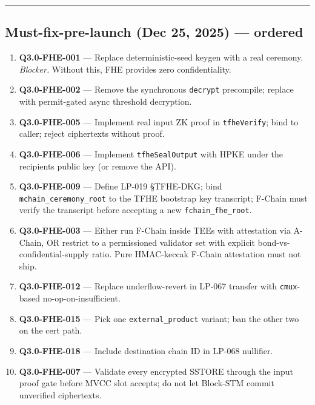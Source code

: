 \documentclass[
]{article}
\providecommand{\tightlist}{%
  \setlength{\itemsep}{0pt}\setlength{\parskip}{0pt}}
\begin{document}
\begin{center}\rule{0.5\linewidth}{0.5pt}\end{center}

\subsection{Must-fix-pre-launch (Dec 25, 2025) ---
ordered}\label{must-fix-pre-launch-dec-25-2025--ordered}

\begin{enumerate}
\def\labelenumi{\arabic{enumi}.}
\tightlist
\item
  \textbf{Q3.0-FHE-001} --- Replace deterministic-seed keygen with a
  real ceremony. \emph{Blocker.} Without this, FHE provides zero
  confidentiality.
\item
  \textbf{Q3.0-FHE-002} --- Remove the synchronous \texttt{decrypt}
  precompile; replace with permit-gated async threshold decryption.
\item
  \textbf{Q3.0-FHE-005} --- Implement real input ZK proof in
  \texttt{tfheVerify}; bind to caller; reject ciphertexts without proof.
\item
  \textbf{Q3.0-FHE-006} --- Implement \texttt{tfheSealOutput} with HPKE
  under the recipient\textquotesingle s public key (or remove the API).
\item
  \textbf{Q3.0-FHE-009} --- Define LP-019 §TFHE-DKG; bind
  \texttt{mchain\_ceremony\_root} to the TFHE bootstrap key transcript;
  F-Chain must verify the transcript before accepting a new
  \texttt{fchain\_fhe\_root}.
\item
  \textbf{Q3.0-FHE-003} --- Either run F-Chain inside TEEs with
  attestation via A-Chain, OR restrict to a permissioned validator set
  with explicit bond-vs-confidential-supply ratio. Pure HMAC-keccak
  F-Chain attestation must not ship.
\item
  \textbf{Q3.0-FHE-012} --- Replace underflow-revert in LP-067 transfer
  with \texttt{cmux}-based no-op-on-insufficient.
\item
  \textbf{Q3.0-FHE-015} --- Pick one \texttt{external\_product} variant;
  ban the other two on the cert path.
\item
  \textbf{Q3.0-FHE-018} --- Include destination chain ID in LP-068
  nullifier.
\item
  \textbf{Q3.0-FHE-007} --- Validate every encrypted SSTORE through the
  input proof gate before MVCC slot accepts; do not let Block-STM commit
  unverified ciphertexts.
\end{enumerate}
\end{document}

